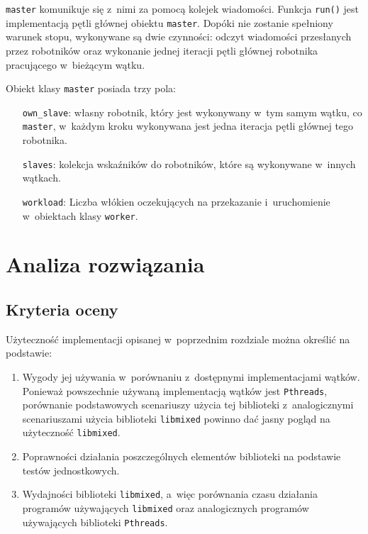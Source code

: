 \documentclass[12pt]{mwart}
\newcommand{\code}{\texttt}
\newcommand{\procbr}{()}
\begin{document}
  \code{master} komunikuje się z~nimi za pomocą kolejek wiadomości.
  Funkcja \code{run\procbr} jest implementacją pętli głównej obiektu \code{master}. Dopóki nie zostanie spełniony warunek stopu,
  wykonywane są dwie czynności: odczyt wiadomości przesłanych przez robotników oraz wykonanie jednej iteracji pętli głównej
  robotnika pracującego w~bieżącym wątku.
\par
\indent
  Obiekt klasy \code{master} posiada trzy pola:
  \begin{itemize}
    \item[\code{own\_slave}:] własny robotnik, który jest wykonywany w~tym samym wątku, co \code{master}, 
      w~każdym kroku wykonywana jest jedna iteracja pętli głównej tego robotnika.
    \item[\code{slaves}:] kolekcja wskaźników do robotników, które są wykonywane w~innych wątkach.
    \item[\code{workload}:] Liczba włókien oczekujących na przekazanie i~uruchomienie w~obiektach klasy \code{worker}.
  \end{itemize}
\par
\newpage
\section{Analiza rozwiązania}
\label{sec:analysis}
\subsection{Kryteria oceny}
\label{sec:criterions}
\indent
	Użyteczność implementacji opisanej w~poprzednim rozdziale można określić na podstawie:
	\begin{enumerate}
		\item Wygody jej używania w~porównaniu z~dostępnymi implementacjami wątków. Ponieważ powszechnie używaną implementacją wątków jest \code{Pthreads},
      porównanie podstawowych scenariuszy użycia tej biblioteki z~analogicznymi scenariuszami użycia biblioteki \code{libmixed} powinno dać jasny pogląd
      na użyteczność \code{libmixed}.
    \item Poprawności działania poszczególnych elementów biblioteki na podstawie testów jednostkowych.
		\item Wydajności biblioteki \code{libmixed}, a~więc porównania czasu działania programów używających \code{libmixed}
      oraz analogicznych programów używających biblioteki \code{Pthreads}.
	\end{enumerate}
\par
%
\end{document}
